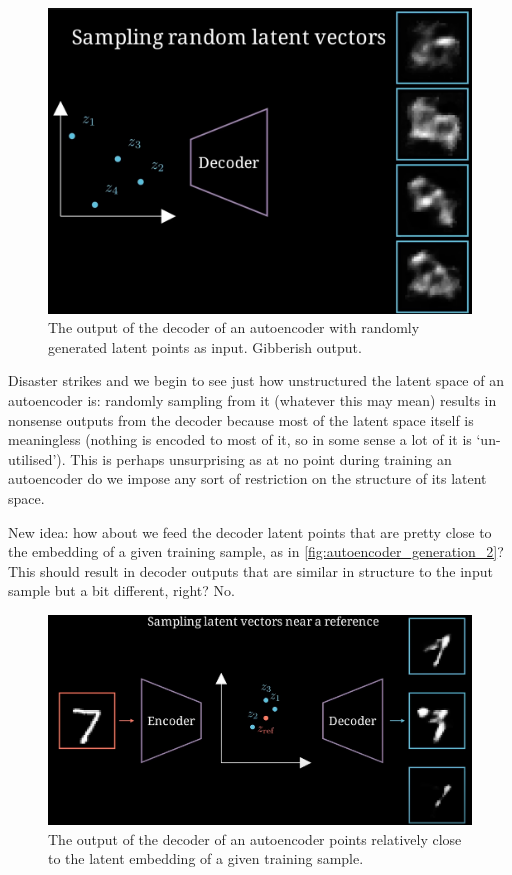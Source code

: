 \documentclass[11pt]{article}
\begin{document}
\begin{figure}[ht]
    \centering
    \includegraphics[width=0.60\columnwidth]{./figures/generative_models/AE_gen_1.png}
    \caption{The output of the decoder of an autoencoder with randomly generated latent points as input. Gibberish output.}
    \label{fig:autoencoder_generation_1}
\end{figure}

\noindent Disaster strikes and we begin to see just how unstructured the latent space of an autoencoder is: randomly sampling from it (whatever this may mean) results in nonsense outputs from the decoder because most of the latent space itself is meaningless (nothing is encoded to most of it, so in some sense a lot of it is `un-utilised'). This is perhaps unsurprising as at no point during training an autoencoder do we impose any sort of restriction on the structure of its latent space.

New idea: how about we feed the decoder latent points that are pretty close to the embedding of a given training sample, as in \autoref{fig:autoencoder_generation_2}? This should result in decoder outputs that are similar in structure to the input sample but a bit different, right? No.

\begin{figure}[ht]
    \centering
    \includegraphics[width=0.75\columnwidth]{./figures/generative_models/AE_gen_2.png}
    \caption{The output of the decoder of an autoencoder points relatively close to the latent embedding of a given training sample.}
    \label{fig:autoencoder_generation_2}
\end{figure}
\end{document}
